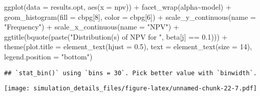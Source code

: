 \documentclass[
]{article}
\newenvironment{Shaded}{\begin{snugshade}}{\end{snugshade}}
\newcommand{\AttributeTok}[1]{\textcolor[rgb]{0.77,0.63,0.00}{#1}}
\newcommand{\DecValTok}[1]{\textcolor[rgb]{0.00,0.00,0.81}{#1}}
\newcommand{\FloatTok}[1]{\textcolor[rgb]{0.00,0.00,0.81}{#1}}
\newcommand{\FunctionTok}[1]{\textcolor[rgb]{0.00,0.00,0.00}{#1}}
\newcommand{\NormalTok}[1]{#1}
\newcommand{\SpecialCharTok}[1]{\textcolor[rgb]{0.00,0.00,0.00}{#1}}
\newcommand{\StringTok}[1]{\textcolor[rgb]{0.31,0.60,0.02}{#1}}
\begin{document}
\begin{Shaded}
\begin{Highlighting}[]
\FunctionTok{ggplot}\NormalTok{(}\AttributeTok{data =}\NormalTok{ results.opt,}
       \FunctionTok{aes}\NormalTok{(}\AttributeTok{x =}\NormalTok{ npv)) }\SpecialCharTok{+}
  \FunctionTok{facet\_wrap}\NormalTok{(alpha}\SpecialCharTok{\textasciitilde{}}\NormalTok{model) }\SpecialCharTok{+}
  \FunctionTok{geom\_histogram}\NormalTok{(}\AttributeTok{fill =}\NormalTok{ cbpg[}\DecValTok{8}\NormalTok{], }\AttributeTok{color =}\NormalTok{ cbpg[}\DecValTok{6}\NormalTok{]) }\SpecialCharTok{+}
  \FunctionTok{scale\_y\_continuous}\NormalTok{(}\AttributeTok{name =} \StringTok{"Frequency"}\NormalTok{) }\SpecialCharTok{+}
  \FunctionTok{scale\_x\_continuous}\NormalTok{(}\AttributeTok{name =} \StringTok{"NPV"}\NormalTok{) }\SpecialCharTok{+}
  \FunctionTok{ggtitle}\NormalTok{(}\FunctionTok{bquote}\NormalTok{(}\FunctionTok{paste}\NormalTok{(}\StringTok{"Distribution(s) of NPV for "}\NormalTok{, beta[j] }\SpecialCharTok{==} \FloatTok{0.1}\NormalTok{))) }\SpecialCharTok{+}
  \FunctionTok{theme}\NormalTok{(}\AttributeTok{plot.title =} \FunctionTok{element\_text}\NormalTok{(}\AttributeTok{hjust =} \FloatTok{0.5}\NormalTok{), }
        \AttributeTok{text =} \FunctionTok{element\_text}\NormalTok{(}\AttributeTok{size =} \DecValTok{14}\NormalTok{),}
        \AttributeTok{legend.position =} \StringTok{"bottom"}\NormalTok{)}
\end{Highlighting}
\end{Shaded}

\begin{verbatim}
## `stat_bin()` using `bins = 30`. Pick better value with `binwidth`.
\end{verbatim}

\texttt{[image: simulation\_details\_files/figure-latex/unnamed-chunk-22-7.pdf]}
\end{document}
